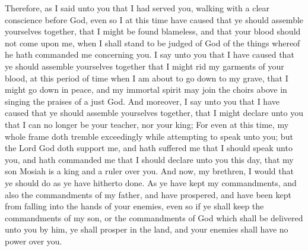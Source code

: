 Therefore, as I said unto you that I had served you, walking with a clear conscience before God, even so I at this time have caused that ye should assemble yourselves together, that I might be found blameless, and that your blood should not come upon me, when I shall stand to be judged of God of the things whereof he hath commanded me concerning you.
\bverse \iffalse I say unto you that I have caused that ye should assemble yourselves together that I might rid my garments of your blood, at this period of time when I am about to go down to my grave, that I might go down in peace, and my immortal spirit may join the choirs above in singing the praises of a just God. \fi
I say unto you that I have caused that ye should assemble yourselves together that I might rid my garments of your blood, at this period of time when I am about to go down to my grave, that I might go down in peace, and my immortal spirit may join the choirs above in singing the praises of a just God.
\bverse \iffalse And moreover, I say unto you that I have caused that ye should assemble yourselves together, that I might declare unto you that I can no longer be your teacher, nor your king; \fi
And moreover, I say unto you that I have caused that ye should assemble yourselves together, that I might declare unto you that I can no longer be your teacher, nor your king;
\bverse \iffalse For even at this time, my whole frame doth tremble exceedingly while attempting to speak unto you; but the Lord God doth support me, and hath suffered me that I should speak unto you, and hath commanded me that I should declare unto you this day, that my son Mosiah is a king and a ruler over you. \fi
For even at this time, my whole frame doth tremble exceedingly while attempting to speak unto you; but the Lord God doth support me, and hath suffered me that I should speak unto you, and hath commanded me that I should declare unto you this day, that my son Mosiah is a king and a ruler over you.
\bverse \iffalse And now, my brethren, I would that ye should do as ye have hitherto done. As ye have kept my commandments, and also the commandments of my father, and have prospered, and have been kept from falling into the hands of your enemies, even so if ye shall keep the commandments of my son, or the commandments of God which shall be delivered unto you by him, ye shall prosper in the land, and your enemies shall have no power over you. \fi
And now, my brethren, I would that ye should do as ye have hitherto done. As ye have kept my commandments, and also the commandments of my father, and have prospered, and have been kept from falling into the hands of your enemies, even so if ye shall keep the commandments of my son, or the commandments of God which shall be delivered unto you by him, ye shall prosper in the land, and your enemies shall have no power over you.
